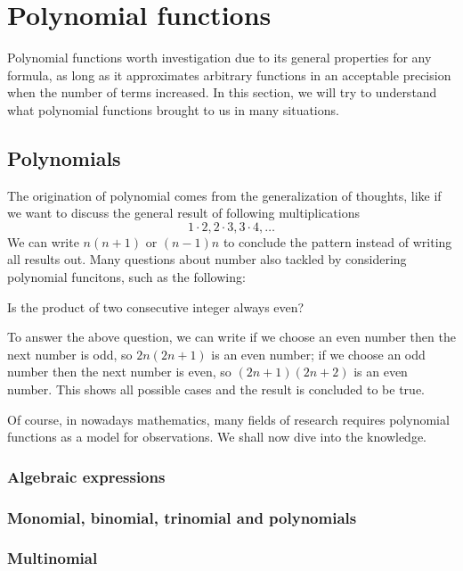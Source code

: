 \documentclass[12pt]{article}
\begin{document}
    \newpage 

    \section{Polynomial functions}

    Polynomial functions worth investigation due to its general properties for any formula, as long as it approximates arbitrary functions in an acceptable precision when the number of terms increased. In this section, we will try to understand what polynomial functions brought to us in many situations.

    \subsection{Polynomials}

    The origination of polynomial comes from the generalization of thoughts, like if we want to discuss the general result of following multiplications \[1\cdot 2, 2\cdot 3, 3\cdot 4, \dots\]
    We can write $n(n+1)$ or $(n-1)n$ to conclude the pattern instead of writing all results out. Many questions about number also tackled by considering polynomial funcitons, such as the following: 
    
    Is the product of two consecutive integer always even?

    To answer the above question, we can write if we choose an even number then the next number is odd, so $2n(2n+1)$ is an even number; if we choose an odd number then the next number is even, so $(2n+1)(2n+2)$ is an even number. This shows all possible cases and the result is concluded to be true.

    Of course, in nowadays mathematics, many fields of research requires polynomial functions as a model for observations. We shall now dive into the knowledge.
    \subsubsection*{Algebraic expressions}

    \subsubsection*{Monomial, binomial, trinomial and polynomials}

    \subsubsection*{Multinomial}
\end{document}
